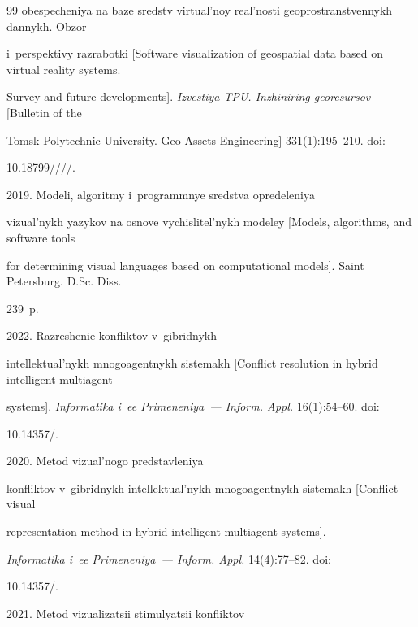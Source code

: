 {{\begin{thebibliography}{99}
obes\-pe\-che\-niya na ba\-ze sredstv vir\-tu\-al'\-noy re\-al'\-nosti geo\-pro\-stranst\-ven\-nykh dan\-nykh. Obzor 

i~pers\-pek\-ti\-vy raz\-ra\-bot\-ki [Software visualization of geospatial data based on virtual reality systems. 

Survey and future developments]. \textit{Izvestiya TPU. Inzhiniring georesursov} [Bulletin of the 

Tomsk Polytechnic University. Geo Assets Engineering] 331(1):195--210. doi: 

10.18799\!/\!/\!/\!/.


    2019. Modeli, al\-go\-rit\-my i~prog\-rammnye sred\-st\-va opre\-de\-le\-niya 

vi\-zu\-al'\-nykh yazy\-kov na osno\-ve vy\-chis\-li\-tel'\-nykh mo\-de\-ley [Models, algorithms, and software tools 

for determining visual languages based on computational models]. Saint Petersburg. D.Sc. Diss. 

239~p.


    2022. Raz\-re\-she\-nie konfliktov v~gib\-rid\-nykh 

in\-tel\-lek\-tu\-al'\-nykh mno\-go\-agent\-nykh sis\-te\-makh [Conflict resolution in hybrid intelligent multiagent 

systems]. \textit{Informatika i~ee Primeneniya~--- Inform. Appl.} 16(1):54--60. doi: 

10.14357\!/.


    2020. Me\-tod vi\-zu\-al'\-no\-go pred\-stav\-le\-niya 

konfliktov v~gib\-rid\-nykh in\-tel\-lek\-tu\-al'\-nykh mno\-go\-agent\-nykh sis\-te\-makh [Conflict visual 

representation method in hybrid intelligent multiagent systems]. 

\textit{Informatika i~ee Primeneniya~--- Inform. Appl.} 14(4):77--82. doi: 

10.14357\!/.


    2021. Me\-tod vi\-zu\-a\-li\-za\-tsii sti\-mu\-lya\-tsii konfliktov 


\end{thebibliography}}}
